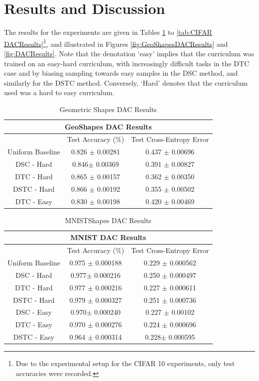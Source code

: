 \section{Results and Discussion}
The results for  the experiments are given in Tables \ref{tab:GeoShapes DACResults} to \ref{tab:CIFAR DACResults}\footnote{Due to the experimental setup for the CIFAR 10 experiments, only test accuracies were recorded.}, and illustrated in Figures \ref{fig:GeoShapesDACResults} and \ref{fig:DACResults}. Note that the denotation `easy' implies that the curriculum was trained on an easy-hard curriculum, with increasingly difficult tasks in the DTC case and by biasing sampling towards easy samples in the DSC method, and similarly for the DSTC method. Conversely, `Hard' denotes that the curriculum used was a hard to easy curriculum.
\begin{table}[h!]
\caption{Geometric Shapes DAC Results} \label{tab:GeoShapes DACResults}
\begin{tabular}{|c||c|c|}
\hline
\multicolumn{3}{|c|}{GeoShapes DAC Results} \\
\hline
 & Test Accuracy (\%) & Test Cross-Entropy Error \\
\hline
Uniform Baseline&  0.826 $\pm$ 0.00281 & 0.437 $\pm$ 0.00696 \\
\hline
DSC - Hard& 0.846$ \pm$ 0.00369 & 0.391 $\pm$ 0.00827 \\
\hline
DTC - Hard&  0.865  $\pm$ 0.00157 & 0.362 $\pm$ 0.00350 \\
\hline
DSTC - Hard & 0.866 $\pm$ 0.00192 & 0.355 $\pm$ 0.00502 \\
\hline
DTC - Easy & 0.830 $\pm$ 0.00198 & 0.420 $\pm$ 0.00469 \\
\hline
\end{tabular}
\end{table}

\begin{table}[h!]
\caption{MNISTShapes DAC Results} \label{tab:MNIST DACResults}
\begin{tabular}{|c||c|c|}
\hline
\multicolumn{3}{|c|}{MNIST DAC Results} \\
\hline
 & Test Accuracy (\%) & Test Cross-Entropy Error \\
\hline
Uniform Baseline&  0.975 $\pm$ 0.000188& 0.229 $\pm$ 0.000562 \\
\hline
DSC - Hard& 0.977$ \pm$ 0.000216& 0.250 $\pm$ 0.000497 \\
\hline
DTC - Hard&  0.977  $\pm$ 0.000216 & 0.227 $\pm$ 0.000611 \\
\hline
DSTC - Hard & 0.979 $\pm$ 0.000327 & 0.251 $\pm$ 0.000736\\
\hline
DSC - Easy& 0.970$ \pm$ 0.000240 & 0.227 $\pm$ 0.00102 \\
\hline
DTC - Easy & 0.970 $\pm$ 0.000276 & 0.224 $\pm$ 0.000696 \\
\hline
DSTC - Easy & 0.964 $\pm$ 0.000314 & 0.228$\pm$ 0.000595 \\
\hline
\end{tabular}
\end{table}

